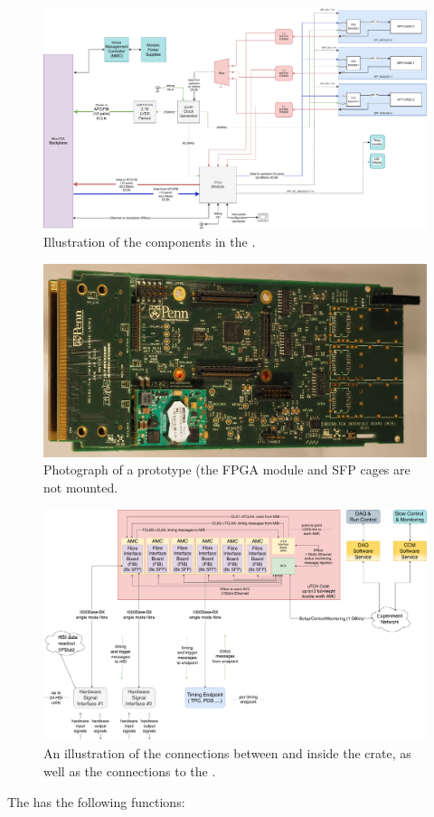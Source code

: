 \documentclass{dune}
\begin{document}
\begin{figure}[h]
\includegraphics[width=\textwidth]{dune_mib_v2.drawio.pdf}
\caption{Illustration of the components in the .}
\label{fig:mib_layout}
\end{figure}

\begin{figure}[h]
\includegraphics[width=\textwidth]{dune_mib_01_cropped.jpg}
\caption{Photograph of a prototype  (the FPGA module and SFP cages are not mounted.}
\label{fig:mib_photo}
\end{figure}


\begin{figure}[h]
\includegraphics[width=\textwidth]{DUNE_SP_Timing_ETL_interface_1apr20.pdf}
\caption{An illustration of the connections between  and  inside the  crate, as well as the connections to the .}
\label{fig:mib_utca_connections}
\end{figure}
The  has the following functions:
\end{document}
